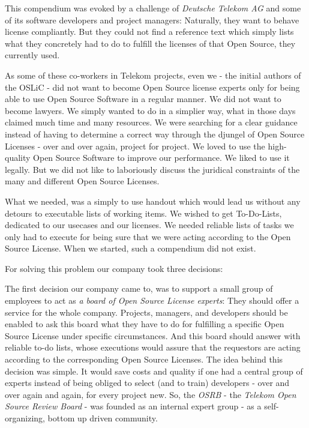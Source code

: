 This compendium was evoked by a challenge of \emph{Deutsche Telekom AG} and some
of its software developers and project managers: Naturally, they want to behave
license compliantly. But they could not find a reference text which simply lists
what they concretely had to do to fulfill the licenses of that Open Source, they
currently used.

As some of these co-workers in Telekom projects, even we - the initial authors
of the OSLiC - did not want to become Open Source license experts only for being
able to use Open Source Software in a regular manner. We did not want to become
lawyers. We simply wanted to do in a simplier way, what in those days claimed
much time and many resources. We were searching for a clear guidance instead of
having to determine a correct way through the djungel of Open Source Licenses -
over and over again, project for project. We loved to use the high-quality Open
Source Software to improve our performance. We liked to use it legally. But we
did not like to laboriously discuss the juridical constraints of the many and
different Open Source Licenses.

What we needed, was a simply to use handout which would lead us without any
detours to executable lists of working items. We wished to get To-Do-Lists,
dedicated to our usecases and our licenses. We needed reliable lists of tasks we
only had to execute for being sure that we were acting according to the Open
Source License. When we started, such a compendium did not exist.

For solving this problem our company took three decisions:

The first decision our company came to, was to support a small group of
employees to act as \emph{a board of Open Source License experts}: They should
offer a service for the whole company. Projects, managers, and developers should
be enabled to ask this board what they have to do for fulfilling a specific Open
Source License under specific circumstances. And this board should answer with
reliable to-do lists, whose executions would assure that the requestors are
acting according to the corresponding Open Source Licenses. The idea behind this
decision was simple. It would save costs and quality if one had a central group
of experts instead of being obliged to select (and to train) developers - over
and over again and again, for every project new. So, the \emph{OSRB} - the
\emph{Telekom Open Source Review Board} - was founded as an internal expert
group - as a self-organizing, bottom up driven community.

